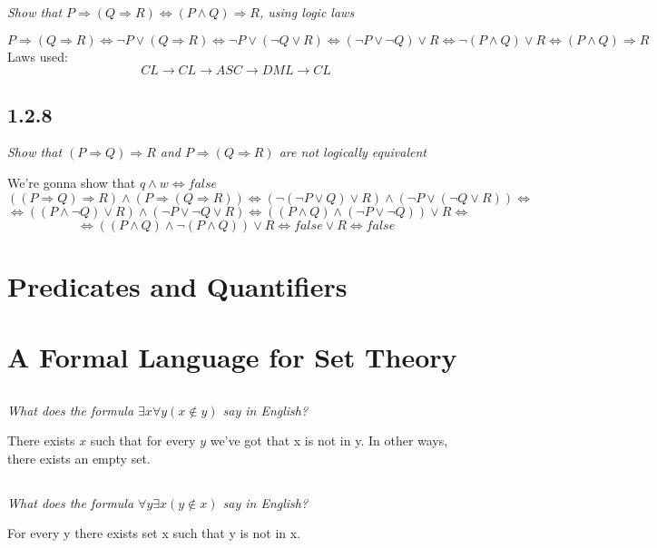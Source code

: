 \documentclass[11pt,oneside,titlepage]{book}
\DeclareMathOperator \eqv {\Leftrightarrow}
\DeclareMathOperator \imp {\Rightarrow}
\begin{document}
\textit{Show that $P \imp (Q \imp R) \eqv (P \land Q) \imp R$, using logic laws}

$$P \imp (Q \imp R) \eqv \neg P \lor (Q \imp R) \eqv \neg P \lor (\neg Q \lor R) \eqv
(\neg P \lor \neg Q) \lor R \eqv \neg (P \land Q) \lor R \eqv (P \land Q) \imp R$$
Laws used:
$$CL \to CL \to ASC \to DML \to CL$$

\subsection*{1.2.8}

\textit{Show that $(P \imp Q) \imp R$ and $P \imp (Q \imp R)$ are not logically equivalent}

We're gonna show that $q \land w \eqv false$
$$((P \imp Q) \imp R) \land (P \imp (Q \imp R)) \eqv (\neg (\neg P \lor Q) \lor R) \land
(\neg P \lor (\neg Q \lor R)) \eqv $$
$$\eqv ((P \land \neg Q) \lor R) \land (\neg P \lor \neg Q \lor R) \eqv
((P \land Q) \land (\neg P \lor \neg Q)) \lor R  \eqv$$
$$ \eqv ((P \land Q) \land \neg ( P \land  Q)) \lor R  \eqv false \lor R \eqv false$$


\section{Predicates and Quantifiers}

\section{A Formal Language for Set Theory}

\subsection{}

\textit{What does the formula $\exists x \forall y (x \notin y)$ say in English? }

There exists $x$ such that for every $y$ we've got that x is not in y. In other ways, there
exists an empty set.

\subsection{}

\textit{What does the formula $\forall y \exists x (y \notin x)$ say in English?}

For every y there exists set x such that y is not in x.

\subsection{}
\end{document}

